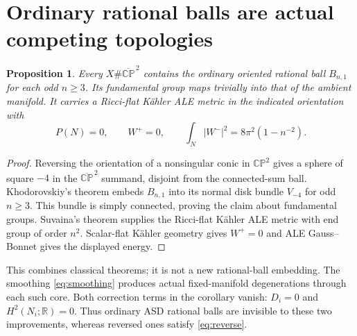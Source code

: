 \documentclass[11pt]{article}
\newtheorem{proposition}[theorem]{Proposition}
\newcommand{\CP}{\mathbb{CP}}
\newcommand{\R}{\mathbb R}
\begin{document}
\section{Ordinary rational balls are actual competing topologies}
\begin{proposition}
Every $X\#\overline{\CP}^{\,2}$ contains the ordinary oriented rational
ball $B_{n,1}$ for each odd $n\ge3$. Its fundamental group maps trivially
into that of the ambient manifold. It carries a Ricci-flat K\"ahler ALE
metric in the indicated orientation with
\[
 P(N)=0,\qquad W^+=0,\qquad
 \int_N|W^-|^2=8\pi^2(1-n^{-2}).
\]
\end{proposition}
\begin{proof}
Reversing the orientation of a nonsingular conic in $\CP^2$ gives a sphere
of square $-4$ in the $\overline{\CP}^{\,2}$ summand, disjoint from the
connected-sum ball. Khodorovskiy's theorem embeds $B_{n,1}$ into its
normal disk bundle $V_{-4}$ for odd $n\ge3$. This bundle is simply
connected, proving the claim about fundamental groups. Suvaina's theorem
supplies the Ricci-flat K\"ahler ALE metric with end group of order $n^2$.
Scalar-flat K\"ahler geometry gives $W^+=0$ and ALE Gauss--Bonnet gives
the displayed energy.
\end{proof}
This combines classical theorems; it is not a new rational-ball embedding.
The smoothing \eqref{eq:smoothing} produces actual fixed-manifold
degenerations through each such core. Both correction terms in the
corollary vanish: $D_i=0$ and $H^2(N_i;\R)=0$.
Thus ordinary ASD rational balls are invisible to these two improvements,
whereas reversed ones satisfy \eqref{eq:reverse}.
\end{document}
